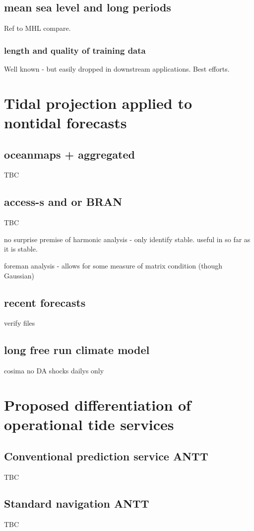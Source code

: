 \subsection{mean sea level and long periods}

Ref to MHL compare.

\subsubsection{length and quality of training data}

Well known - but easily dropped in downstream applications.
Best efforts.


\section{Tidal projection applied to nontidal forecasts}
\subsection{oceanmaps + aggregated}
TBC

\subsection{access-s and or BRAN}
TBC



no surprise
premise of harmonic analysis - only identify stable.
useful in so far as it is stable.

foreman analysis - allows for some measure of matrix condition (though Gaussian)


\subsection{ recent forecasts }
verify files


\subsection{ long free run climate model }
cosima
no DA shocks
dailys only


\section{Proposed differentiation of operational tide services}
\subsection{Conventional prediction service ANTT}

TBC

\subsection{Standard navigation ANTT}

TBC
